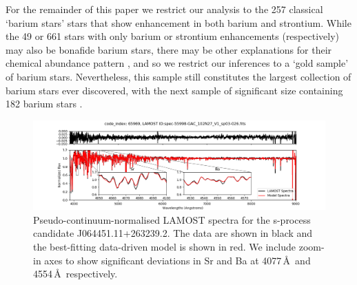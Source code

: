 \documentclass[a4paper,fleqn,usenatbib]{mnras}
\begin{document}
For the remainder of this paper we restrict our analysis to the 257 classical `barium stars' stars that show enhancement in both barium and strontium. While the 49 or 661 stars with only barium or strontium enhancements (respectively) may also be bonafide barium stars, there may be other explanations for their chemical abundance pattern \citep[e.g.,][]{maiorca2011}, and so we restrict our inferences to a `gold sample' of barium stars. Nevertheless, this sample still constitutes the largest collection of barium stars ever discovered, with the next sample of significant size containing 182 barium stars \citep[e.g.,][]{decastro2016}.


\begin{figure}
	\includegraphics[width=\textwidth]{posterchild.png}
    \caption{Pseudo-continuum-normalised LAMOST spectra for the s-process candidate J064451.11+263239.2. The data are shown in black and the best-fitting data-driven model is shown in red. We include zoom-in axes to show significant deviations in Sr and Ba at  4077\,\AA\ and 4554\,\AA\, respectively.}
    \label{fig:figure1}
\end{figure}
\end{document}
